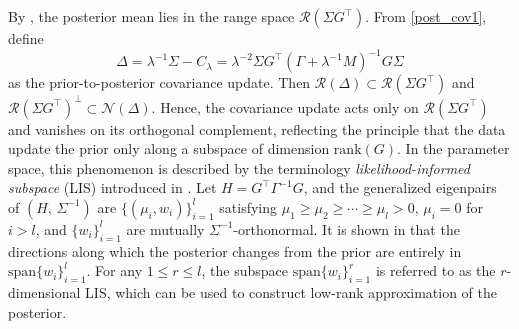 \documentclass[]{myarticle}
\begin{document}
By , the posterior mean lies in the range space $\mathcal{R}(\Sigma G^\top)$. 
From \cref{post_cov1}, define 
\[
\Delta=\lambda^{-1}\Sigma-C_{\lambda}
=\lambda^{-2}\Sigma G^{\top}(\Gamma+\lambda^{-1}M)^{-1}G\Sigma
\]
as the prior-to-posterior covariance update. 
Then $\mathcal{R}(\Delta)\subset\mathcal{R}(\Sigma G^\top)$ and 
$\mathcal{R}(\Sigma G^\top)^{\perp}\subset\mathcal{N}(\Delta)$. 
Hence, the covariance update acts only on $\mathcal R(\Sigma G^\top)$ and vanishes on its orthogonal complement, reflecting the principle that the data update the prior only along a subspace of dimension $\mathrm{rank}(G)$. In the parameter space, this phenomenon is described by the terminology \emph{likelihood-informed subspace} (LIS) introduced in \cite{cui2014likelihood,spantini2015optimal}. Let $H=G^{\top}\Gamma^{-1}G$, and the generalized eigenpairs of $(H,\,\Sigma^{-1})$ are $\{(\mu_{i},w_i)\}_{i=1}^{l}$ satisfying $\mu_{1}\ge \mu_{2}\ge \cdots \ge \mu_{l}>0$, $\mu_{i}=0$ for $i>l$, and $\{w_i\}_{i=1}^{l}$ are mutually $\Sigma^{-1}$-orthonormal. It is shown in \cite{spantini2015optimal} that the directions along which the posterior changes from the prior are entirely in $\mathrm{span}\{w_{i}\}_{i=1}^{l}$. For any $1\le r \le l$, the subspace $\mathrm{span}\{w_{i}\}_{i=1}^{r}$ is referred to as the $r$-dimensional LIS, which can be used to construct low-rank approximation of the posterior.
\end{document}
